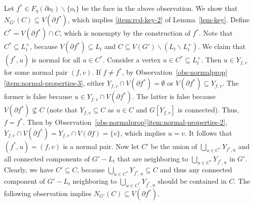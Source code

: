 \documentclass[a4paper,11pt]{article}
\numberwithin{lemma}{section}
\begin{document}
Let $f^* \in F_\eta(\partial o_t) \backslash \{o_t\}$ be the face in the above observation.
We show that $N_{G'}(C) \subseteq V(\partial f^*)$, which implies \ref{item:rcd-key-2} of Lemma~\ref{lem-key}.
Define $C^* = V(\partial f^*) \cap C$, which is nonempty by the construction of $f^*$.
Note that $C^* \subseteq L_t^+$, because $V(\partial f^*) \subseteq L_t$ and $C \subseteq V(G') \backslash (L_t \backslash L_t^+)$.
We claim that $(f^*,u)$ is normal for all $u \in C^*$.
Consider a vertex $u \in C^* \subseteq L_t^+$.
Then $u \in Y_{f,v}$ for some normal pair $(f,v)$.
If $f \neq f^*$, by Observation~\ref{obs-normalprop}\ref{item:normal-properties-3}, either $Y_{f,v} \cap V(\partial f^*) = \emptyset$ or $V(\partial f^*) \subseteq Y_{f,v}$.
The former is false because $u \in Y_{f,v} \cap V(\partial f^*)$.
The latter is false because $V(\partial f^*) \nsubseteq C$ (note that $Y_{f,v} \subseteq C$ as $u \in C$ and $G[Y_{f,v}]$ is connected).
Thus, $f = f^*$.
Then by Observation~\ref{obs-normalprop}\ref{item:normal-properties-2}, $Y_{f,v} \cap V(\partial f^*) = Y_{f,v} \cap V(\partial f) = \{v\}$, which implies $u = v$.
It follows that $(f^*,u) = (f,v)$ is a normal pair.
Now let $C'$ be the union of $\bigcup_{u \in C^*} Y_{f^*,u}$ and all connected components of $G' - L_t$ that are neighboring to $\bigcup_{u \in C^*} Y_{f^*,u}$ in $G'$.
Clearly, we have $C' \subseteq C$, because $\bigcup_{u \in C^*} Y_{f^*,u} \subseteq C$ and thus any connected component of $G' - L_t$ neighboring to $\bigcup_{u \in C^*} Y_{f^*,u}$ should be contained in $C$.
The following observation implies $N_{G'}(C) \subseteq V(\partial f^*)$.
\end{document}
